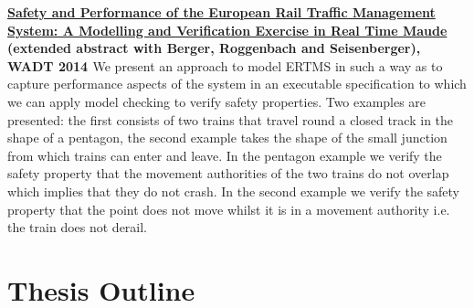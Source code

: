 \textbf{\ul{Safety and Performance of the European Rail Traffic Management System: A Modelling and Verification Exercise in Real Time Maude} (extended abstract with Berger, Roggenbach and Seisenberger), WADT 2014 \cite{AL14c}} We present an approach to model ERTMS in such a way as to capture performance aspects of the system in an executable specification to which we can apply model checking to verify safety properties. Two examples are presented: the first consists of two trains that travel round a closed track in the shape of a pentagon, the second example takes the shape of the small junction from which trains can enter and leave. In the pentagon example we verify the safety property that the movement authorities of the two trains do not overlap which implies that they do not crash. In the second example we verify the safety property that the point does not move whilst it is in a movement authority i.e. the train does not derail.


\section{Thesis Outline}

